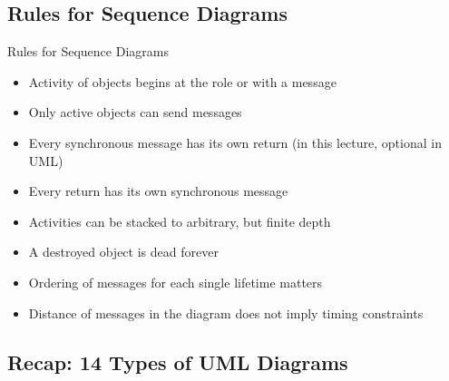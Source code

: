 \subsection{Rules for Sequence Diagrams}
\begin{frame}{\insertsubsection}
	\begin{fancycolumns}
		\begin{note}{Rules for Sequence Diagrams}
			\begin{itemize}
				\item Activity of objects begins at the role or with a message
				\item Only active objects can send messages
				\item Every synchronous message has its own return (in this lecture, optional in UML)
				\item Every return has its own synchronous message
				\item Activities can be stacked to arbitrary, but finite depth
				\item A destroyed object is dead forever
				\item Ordering of messages for each single lifetime matters
				\item Distance of messages in the diagram does not imply timing constraints
			\end{itemize}
		\end{note}
	\end{fancycolumns}
\end{frame}

\subsection*{Recap: 14 Types of UML Diagrams}
\begin{frame}{\insertsubsection\ \mytitlesource{\umlspec}}
	\centering{}
	
\end{frame}

